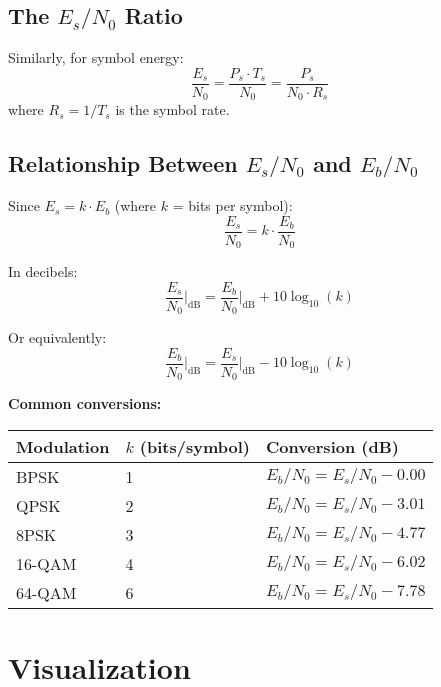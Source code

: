 \subsection{The $E_s/N_0$ Ratio}

Similarly, for symbol energy:
\begin{equation}
\frac{E_s}{N_0} = \frac{P_s \cdot T_s}{N_0} = \frac{P_s}{N_0 \cdot R_s}
\end{equation}
where $R_s = 1/T_s$ is the symbol rate.

\subsection{Relationship Between $E_s/N_0$ and $E_b/N_0$}

Since $E_s = k \cdot E_b$ (where $k$ = bits per symbol):
\begin{equation}
\frac{E_s}{N_0} = k \cdot \frac{E_b}{N_0}
\end{equation}

In decibels:
\begin{equation}
\frac{E_s}{N_0}\bigg|_{\text{dB}} = \frac{E_b}{N_0}\bigg|_{\text{dB}} + 10\log_{10}(k)
\end{equation}

Or equivalently:
\begin{equation}
\frac{E_b}{N_0}\bigg|_{\text{dB}} = \frac{E_s}{N_0}\bigg|_{\text{dB}} - 10\log_{10}(k)
\end{equation}

\textbf{Common conversions:}
\begin{center}
\begin{tabular}{@{}lll@{}}
\toprule
Modulation & $k$ (bits/symbol) & Conversion (dB) \\
\midrule
BPSK & 1 & $E_b/N_0 = E_s/N_0 - 0.00$ \\
QPSK & 2 & $E_b/N_0 = E_s/N_0 - 3.01$ \\
8PSK & 3 & $E_b/N_0 = E_s/N_0 - 4.77$ \\
16-QAM & 4 & $E_b/N_0 = E_s/N_0 - 6.02$ \\
64-QAM & 6 & $E_b/N_0 = E_s/N_0 - 7.78$ \\
\bottomrule
\end{tabular}
\end{center}

\section{Visualization}

